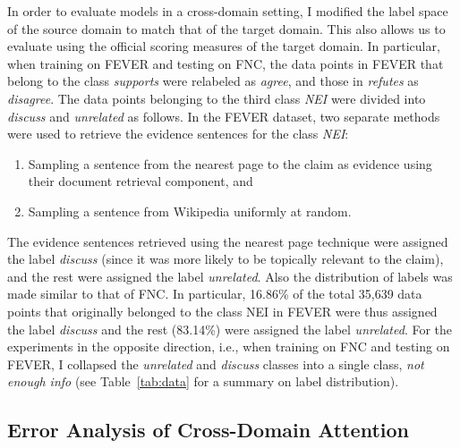 \documentclass{article}
\begin{document}
In order to evaluate models in a cross-domain setting, I modified the label space of the source domain to match that of the target domain. This  also allows us to evaluate using the official scoring measures of the target domain. In particular, when training on FEVER and testing on FNC, the data points in FEVER that belong to the class \textit{supports} were relabeled as \textit{agree}, and those in \textit{refutes} as \textit{disagree}. The data points belonging to the third class \textit{NEI} were divided into \textit{discuss} and \textit{unrelated} as follows.
In the FEVER dataset, two separate methods were used to retrieve the evidence sentences for the class \textit{NEI}: 
\begin{enumerate}
\item Sampling a sentence from the nearest page to the claim as evidence using their document retrieval component, and 
\item Sampling a sentence from Wikipedia uniformly at random. 

\end{enumerate}
The evidence sentences retrieved using the nearest page technique were assigned the label \textit{discuss} (since it was more likely to be topically relevant to the claim), and the rest were assigned the label \textit{unrelated}. Also the distribution of labels was made similar to that of FNC. In particular, 16.86\% of the total 35,639 data points that originally belonged to the class NEI in FEVER were thus assigned the label \textit{discuss} and the rest (83.14\%) were assigned the label \textit{unrelated}. For the experiments in the opposite direction, i.e., when training on FNC and testing on FEVER, I collapsed the \textit{unrelated} and \textit{discuss} classes into a single class, \textit{not enough info} (see Table~\ref{tab:data} for a summary on label distribution).


\subsection{Error Analysis of Cross-Domain Attention}\label{attention_analysis}
\end{document}
